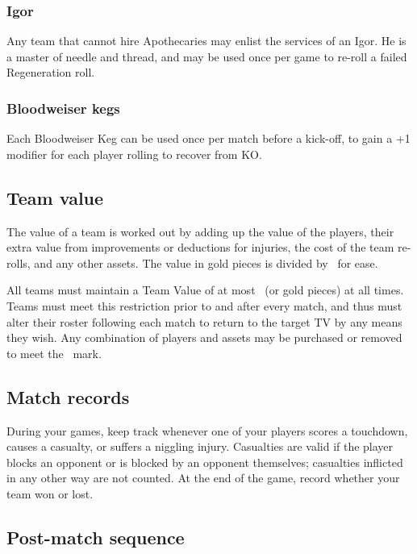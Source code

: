 \subsubsection{Igor}
\par Any team that cannot hire Apothecaries may enlist the services of an Igor. He is a master of needle and thread, and may be used once per game to re-roll a failed Regeneration roll.

\subsubsection{Bloodweiser kegs}
\par Each Bloodweiser Keg can be used once per match before a kick-off, to gain a +1 modifier for each player rolling to recover from KO.

\subsection{Team value}
\par The value of a team is worked out by adding up the value of the players, their extra value from improvements or deductions for injuries, the cost of the team re-rolls, and any other assets. The value in gold pieces is divided by \TVdivisor\ for ease.
\par All teams must maintain a Team Value of at most \TV\ (or \numprint{\TVGP} gold pieces) at all times. Teams must meet this restriction prior to and after every match, and thus must alter their roster following each match to return to the target TV by any means they wish. Any combination of players and assets may be purchased or removed to meet the \TV\ mark.

\subsection{Match records}
\par During your games, keep track whenever one of your players scores a touchdown, causes a casualty, or suffers a niggling injury. Casualties are valid if the player blocks an opponent or is blocked by an opponent themselves; casualties inflicted in any other way are not counted. At the end of the game, record whether your team won or lost.

\subsection{Post-match sequence}

